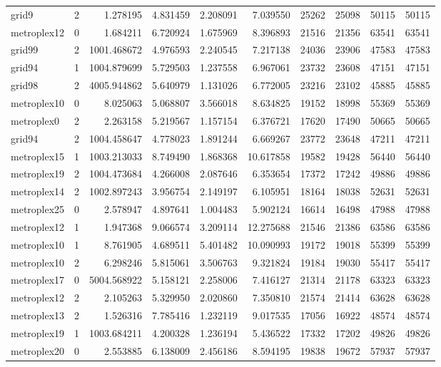 \begin{longtable}{|l|r|r|r|r|r|r|r|r|r|}
grid9 & 2 & 1.278195 & 4.831459 & 2.208091 & 7.039550 & 25262 & 25098 & 50115 & 50115 \\
metroplex12 & 0 & 1.684211 & 6.720924 & 1.675969 & 8.396893 & 21516 & 21356 & 63541 & 63541 \\
grid99 & 2 & 1001.468672 & 4.976593 & 2.240545 & 7.217138 & 24036 & 23906 & 47583 & 47583 \\
grid94 & 1 & 1004.879699 & 5.729503 & 1.237558 & 6.967061 & 23732 & 23608 & 47151 & 47151 \\
grid98 & 2 & 4005.944862 & 5.640979 & 1.131026 & 6.772005 & 23216 & 23102 & 45885 & 45885 \\
metroplex10 & 0 & 8.025063 & 5.068807 & 3.566018 & 8.634825 & 19152 & 18998 & 55369 & 55369 \\
metroplex0 & 2 & 2.263158 & 5.219567 & 1.157154 & 6.376721 & 17620 & 17490 & 50665 & 50665 \\
grid94 & 2 & 1004.458647 & 4.778023 & 1.891244 & 6.669267 & 23772 & 23648 & 47211 & 47211 \\
metroplex15 & 1 & 1003.213033 & 8.749490 & 1.868368 & 10.617858 & 19582 & 19428 & 56440 & 56440 \\
metroplex19 & 2 & 1004.473684 & 4.266008 & 2.087646 & 6.353654 & 17372 & 17242 & 49886 & 49886 \\
metroplex14 & 2 & 1002.897243 & 3.956754 & 2.149197 & 6.105951 & 18164 & 18038 & 52631 & 52631 \\
metroplex25 & 0 & 2.578947 & 4.897641 & 1.004483 & 5.902124 & 16614 & 16498 & 47988 & 47988 \\
metroplex12 & 1 & 1.947368 & 9.066574 & 3.209114 & 12.275688 & 21546 & 21386 & 63586 & 63586 \\
metroplex10 & 1 & 8.761905 & 4.689511 & 5.401482 & 10.090993 & 19172 & 19018 & 55399 & 55399 \\
metroplex10 & 2 & 6.298246 & 5.815061 & 3.506763 & 9.321824 & 19184 & 19030 & 55417 & 55417 \\
metroplex17 & 0 & 5004.568922 & 5.158121 & 2.258006 & 7.416127 & 21314 & 21178 & 63323 & 63323 \\
metroplex12 & 2 & 2.105263 & 5.329950 & 2.020860 & 7.350810 & 21574 & 21414 & 63628 & 63628 \\
metroplex13 & 2 & 1.526316 & 7.785416 & 1.232119 & 9.017535 & 17056 & 16922 & 48574 & 48574 \\
metroplex19 & 1 & 1003.684211 & 4.200328 & 1.236194 & 5.436522 & 17332 & 17202 & 49826 & 49826 \\
metroplex20 & 0 & 2.553885 & 6.138009 & 2.456186 & 8.594195 & 19838 & 19672 & 57937 & 57937 \\

\end{longtable}
